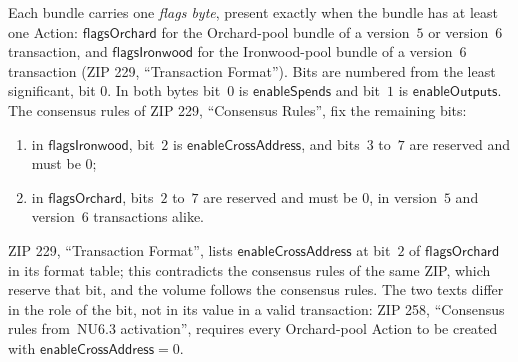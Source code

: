 \documentclass[11pt,a4paper]{article}
\theoremstyle{definition}
\begin{document}
Each bundle carries one \emph{flags byte}, present exactly when the bundle
has at least one Action: $\mathsf{flagsOrchard}$ for the Orchard-pool bundle
of a version~$5$ or version~$6$ transaction, and $\mathsf{flagsIronwood}$ for
the Ironwood-pool bundle of a version~$6$ transaction (ZIP 229,
``Transaction Format''). Bits are numbered from the least significant, bit
$0$. In both bytes bit~$0$ is $\mathsf{enableSpends}$ and bit~$1$ is
$\mathsf{enableOutputs}$. The consensus rules of ZIP 229, ``Consensus
Rules'', fix the remaining bits:
\begin{enumerate}
\item in $\mathsf{flagsIronwood}$, bit~$2$ is $\mathsf{enableCrossAddress}$,
  and bits~$3$ to~$7$ are reserved and must be $0$;
\item in $\mathsf{flagsOrchard}$, bits~$2$ to~$7$ are reserved and must be
  $0$, in version~$5$ and version~$6$ transactions alike.
\end{enumerate}
ZIP 229, ``Transaction Format'', lists $\mathsf{enableCrossAddress}$ at
bit~$2$ of $\mathsf{flagsOrchard}$ in its format table; this contradicts
the consensus rules of the same ZIP, which reserve that bit, and the volume
follows the consensus rules. The two texts differ in the role of
the bit, not in its value in a valid transaction: ZIP 258, ``Consensus rules
from~NU6.3 activation'', requires every Orchard-pool Action to be created
with $\mathsf{enableCrossAddress} = 0$.
\end{document}
